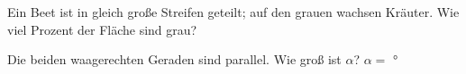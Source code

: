 \documentclass[11pt]{article}
\begin{document}
\begin{aufgabe}{\begin{minipage}[t]{0.6\linewidth}Ein Beet ist in gleich große Streifen geteilt; auf den grauen wachsen Kräuter. Wie viel Prozent der Fläche sind grau? \leerfeld[\%]\end{minipage}\hfill\begin{minipage}[t]{0.37\linewidth}\vspace{0pt}
\end{minipage}}
\end{aufgabe}

\begin{aufgabe}{\begin{minipage}[t]{0.6\linewidth}Die beiden waagerechten Geraden sind parallel. Wie groß ist $\alpha$? $\alpha =$ \leerfeld °\end{minipage}\hfill\begin{minipage}[t]{0.37\linewidth}\vspace{0pt}
\end{minipage}}
\end{aufgabe}
\end{document}
